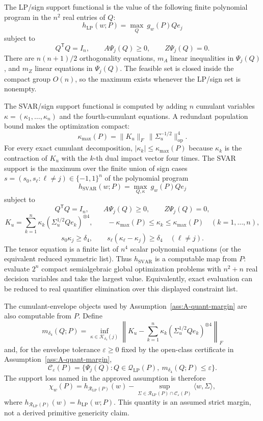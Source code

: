 \documentclass[11pt]{article}
\newcommand{\transpose}{\mathsf{T}}
\theoremstyle{definition}
\theoremstyle{plain}
\theoremstyle{remark}
\begin{document}
The LP/sign support functional is the value of the following finite polynomial
program in the \(n^2\) real entries of \(Q\):
\[
h_{\mathrm{LP}}(w;P)=
\max_Q\ g_w(P)Qe_j
\]
subject to
\[
Q^\transpose Q=I_n,\qquad A\Psi_j(Q)\ge0,\qquad Z\Psi_j(Q)=0.
\]
There are \(n(n+1)/2\) orthogonality equations, \(m_A\) linear inequalities in
\(\Psi_j(Q)\), and \(m_Z\) linear equations in \(\Psi_j(Q)\).  The feasible set
is closed inside the compact group \(O(n)\), so the maximum exists whenever the
LP/sign set is nonempty.

The SVAR/sign support functional is computed by adding \(n\) cumulant variables
\(\kappa=(\kappa_1,\ldots,\kappa_n)\) and the fourth-cumulant equations.  A
redundant population bound makes the optimization compact:
\[
\kappa_{\max}(P)=\|K_u\|_F\,\|\Sigma_u^{-1/2}\|_{\mathrm{op}}^4.
\]
For every exact cumulant decomposition,
\(|\kappa_k|\le\kappa_{\max}(P)\) because \(\kappa_k\) is the contraction of
\(K_u\) with the \(k\)-th dual impact vector four times.  The SVAR support is
the maximum over the finite union of sign cases \(s=(s_0,s_\ell:\ell\ne j)\in
\{-1,1\}^{n}\) of the polynomial program
\[
h_{\mathrm{SVAR}}(w;P)=\max_{Q,\kappa}\ g_w(P)Qe_j
\]
subject to
\[
Q^\transpose Q=I_n,\qquad A\Psi_j(Q)\ge0,\qquad Z\Psi_j(Q)=0,
\]
\[
K_u=\sum_{k=1}^n\kappa_k(\Sigma_u^{1/2}Qe_k)^{\otimes4},
\qquad -\kappa_{\max}(P)\le\kappa_k\le\kappa_{\max}(P)\quad(k=1,\ldots,n),
\]
\[
s_0\kappa_j\ge\delta_4,\qquad
s_\ell(\kappa_\ell-\kappa_j)\ge\delta_4\quad(\ell\ne j).
\]
The tensor equation is a finite list of \(n^4\) scalar polynomial equations
(or the equivalent reduced symmetric list).  Thus \(h_{\mathrm{SVAR}}\) is a
computable map from \(P\): evaluate \(2^n\) compact semialgebraic global
optimization problems with \(n^2+n\) real decision variables and take the
largest value.  Equivalently, exact evaluation can be reduced to real
quantifier elimination over this displayed constraint list.

The cumulant-envelope objects used by
Assumption~\ref{ass:A-quant-margin} are also computable from \(P\).  Define
\[
m_{\delta_4}(Q;P)=
\inf_{\kappa\in\mathcal K_{\delta_4}(j)}
\left\|K_u-\sum_{k=1}^n\kappa_k(\Sigma_u^{1/2}Qe_k)^{\otimes4}\right\|_F
\]
and, for the envelope tolerance \(\varepsilon\ge0\) fixed by the open-class
certificate in Assumption~\ref{ass:A-quant-margin},
\[
\mathcal C_\varepsilon(P)=
\{\Psi_j(Q):Q\in\mathcal Q_{\mathrm{LP}}(P),\
m_{\delta_4}(Q;P)\le\varepsilon\}.
\]
The support loss named in the approved assumption is therefore
\[
\chi_w(P)=
h_{\mathcal R_{\mathrm{LP}}(P)}(w)
-
\sup_{\Sigma\in\mathcal R_{\mathrm{LP}}(P)\cap\mathcal C_\varepsilon(P)}
\langle w,\Sigma\rangle,
\]
where \(h_{\mathcal R_{\mathrm{LP}}(P)}(w)=h_{\mathrm{LP}}(w;P)\).  This
quantity is an assumed strict margin, not a derived primitive genericity
claim.
\end{document}
